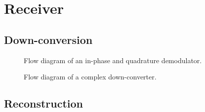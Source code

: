 \section{Receiver}


\subsection{Down-conversion}

\begin{figure}[htb]
	\centering
	
	\caption{Flow diagram of an in-phase and quadrature demodulator.}
\end{figure}
\begin{figure}[htb]
	\centering
	
	\caption{Flow diagram of a complex down-converter.}
\end{figure}

\subsection{Reconstruction}
